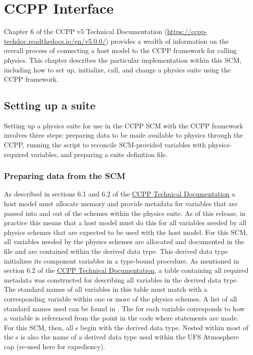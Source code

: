 \chapter{CCPP Interface}
\label{chapter: ccpp_interface}

Chapter 6 of the CCPP v5 Technical Documentation (\url{https://ccpp-techdoc.readthedocs.io/en/v5.0.0/}) provides a wealth of information on the overall process of connecting a host model to the CCPP framework for calling physics. This chapter describes the particular implementation within this SCM, including how to set up, initialize, call, and change a physics suite using the CCPP framework.

\section{Setting up a suite}

Setting up a physics suite for use in the CCPP SCM with the CCPP framework involves three steps: preparing data to be made available to physics through the CCPP, running the  script to reconcile SCM-provided variables with physics-required variables, and preparing a suite definition file.

\subsection{Preparing data from the SCM}

As described in sections 6.1 and 6.2 of the \href{https://ccpp-techdoc.readthedocs.io/en/v5.0.0/}{CCPP Technical Documentation} a host model must allocate memory and provide metadata for variables that are passed into and out of the schemes within the physics suite. As of this release, in practice this means that a host model must do this for all variables needed by all physics schemes that are expected to be used with the host model. For this SCM, all variables needed by the physics schemes are allocated and documented in the file  and are contained within the  derived data type. This derived data type initializes its component variables in a  type-bound procedure. As mentioned in section 6.2 of the \href{https://ccpp-techdoc.readthedocs.io/en/v5.0.0/}{CCPP Technical Documentation}, a table containing all required metadata was constructed for describing all variables in the  derived data type. The standard names of all variables in this table must match with a corresponding variable within one or more of the physics schemes. A list of all standard names used can be found in . The  for each variable corresponds to how a variable is referenced from the point in the code where  statements are made. For this SCM, then, all s begin with the  derived data type. Nested within most of the s is also the name of a derived data type used within the UFS Atmosphere cap (re-used here for expediency). 

